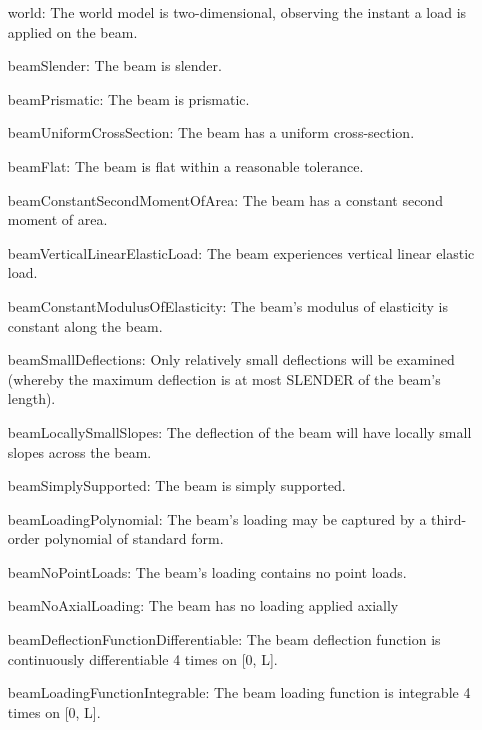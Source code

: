 \documentclass[12pt]{article}
\begin{document}
\begin{itemize}
\item[world:\phantomsection\label{world}]{The world model is two-dimensional, observing the instant a load is applied on the beam.}
\item[beamSlender:\phantomsection\label{beamSlender}]{The beam is slender.}
\item[beamPrismatic:\phantomsection\label{beamPrismatic}]{The beam is prismatic.}
\item[beamUniformCrossSection:\phantomsection\label{beamUniformCrossSection}]{The beam has a uniform cross-section.}
\item[beamFlat:\phantomsection\label{beamFlat}]{The beam is flat within a reasonable tolerance.}
\item[beamConstantSecondMomentOfArea:\phantomsection\label{beamConstantSecondMomentOfArea}]{The beam has a constant second moment of area.}
\item[beamVerticalLinearElasticLoad:\phantomsection\label{beamVerticalLinearElasticLoad}]{The beam experiences vertical linear elastic load.}
\item[beamConstantModulusOfElasticity:\phantomsection\label{beamConstantModulusOfElasticity}]{The beam's modulus of elasticity is constant along the beam.}
\item[beamSmallDeflections:\phantomsection\label{beamSmallDeflections}]{Only relatively small deflections will be examined (whereby the maximum deflection is at most SLENDER of the beam's length).}
\item[beamLocallySmallSlopes:\phantomsection\label{beamLocallySmallSlopes}]{The deflection of the beam will have locally small slopes across the beam.}
\item[beamSimplySupported:\phantomsection\label{beamSimplySupported}]{The beam is simply supported.}
\item[beamLoadingPolynomial:\phantomsection\label{beamLoadingPolynomial}]{The beam's loading may be captured by a third-order polynomial of standard form.}
\item[beamNoPointLoads:\phantomsection\label{beamNoPointLoads}]{The beam's loading contains no point loads.}
\item[beamNoAxialLoading:\phantomsection\label{beamNoAxialLoading}]{The beam has no loading applied axially}
\item[beamDeflectionFunctionDifferentiable:\phantomsection\label{beamDeflectionFunctionDifferentiable}]{The beam deflection function is continuously differentiable 4 times on [0, L].}
\item[beamLoadingFunctionIntegrable:\phantomsection\label{beamLoadingFunctionIntegrable}]{The beam loading function is integrable 4 times on [0, L].}
\end{itemize}
\end{document}
